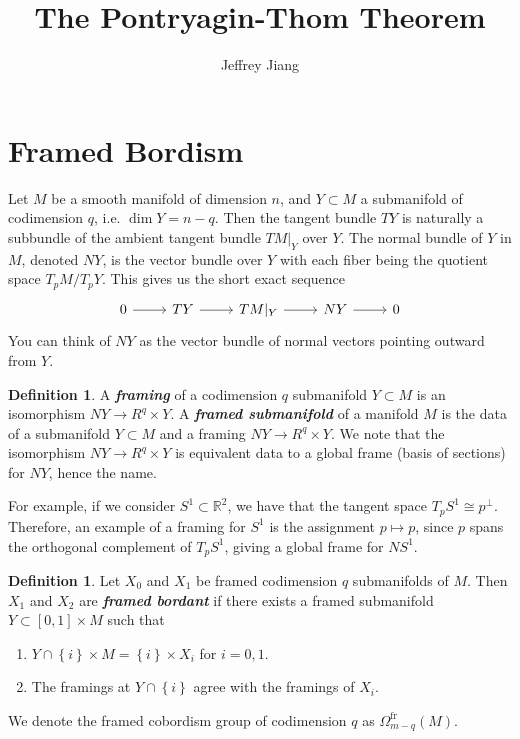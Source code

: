 \documentclass[psamsfonts]{amsart}
\theoremstyle{definition}
\newtheorem{defn}[thm]{Definition}
\theoremstyle{remark}
\newcommand{\R}{\mathbb{R}}
\newcommand{\ib}[1]{\textbf{\textit{#1}}}
\newcommand{\set}[1]{\left\lbrace #1 \right\rbrace}
\begin{document}
\author{Jeffrey Jiang}
\title{The Pontryagin-Thom Theorem}
\maketitle
\setcounter{section}{1}
\section*{Framed Bordism}
%
Let $M$ be a smooth manifold of dimension $n$, and $Y \subset M$ a submanifold of codimension $q$, i.e. $\dim Y = n - q$. Then the tangent bundle $TY$ is naturally a subbundle of the ambient tangent bundle $TM\vert_Y$ over $Y$. The normal bundle of $Y$ in $M$, denoted $NY$, is the vector bundle over $Y$ with each fiber being the quotient space $T_pM / T_pY$. This gives us the short exact sequence
$$\begin{tikzcd}
0 \ar[r] & TY \ar[r] & TM\vert_Y \ar[r] & NY \ar[r] & 0
\end{tikzcd}$$
You can think of $NY$ as the vector bundle of normal vectors pointing outward from $Y$. 
%
\begin{defn}
A \ib{framing} of a codimension $q$ submanifold $Y \subset M$ is an isomorphism $NY \to R^q \times Y$. A \ib{framed submanifold} of a manifold $M$ is the data of a submanifold $Y \subset M$ and a framing $NY \to R^q \times Y$. We note that the isomorphism $NY \to R^q \times Y$ is equivalent data to a global frame (basis of sections) for $NY$, hence the name.
\end{defn}
For example, if we consider $S^1 \subset \R^2$, we have that the tangent space $T_pS^1 \cong p^\perp$. Therefore, an example of a framing for $S^1$ is the assignment $p \mapsto p$, since $p$ spans the orthogonal complement of $T_pS^1$, giving a global frame for $NS^1$.
%
\begin{defn}
Let $X_0$ and $X_1$ be framed codimension $q$ submanifolds of $M$. Then $X_1$ and $X_2$ are \ib{framed bordant} if there exists a framed submanifold $Y \subset [0,1] \times M$ such that
\begin{enumerate}
\item $Y \cap \set{i} \times M = \set{i} \times X_i$ for $i = 0,1$.
\item The framings at $Y \cap \set{i}$ agree with the framings of $X_i$.
\end{enumerate}
We denote the framed cobordism group of codimension $q$ as $\Omega^{\text{fr}}_{m-q}(M)$. 
\end{defn}
\end{document}
